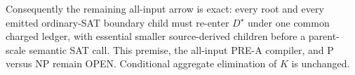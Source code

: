 Consequently the remaining all-input arrow is exact: every root and every
emitted ordinary-SAT boundary child must re-enter $D^\star$ under one common
charged ledger, with essential smaller source-derived children before a
parent-scale semantic SAT call.  This premise, the all-input PRE-A compiler,
and P versus NP remain OPEN.  Conditional aggregate elimination of $K$ is
unchanged.
